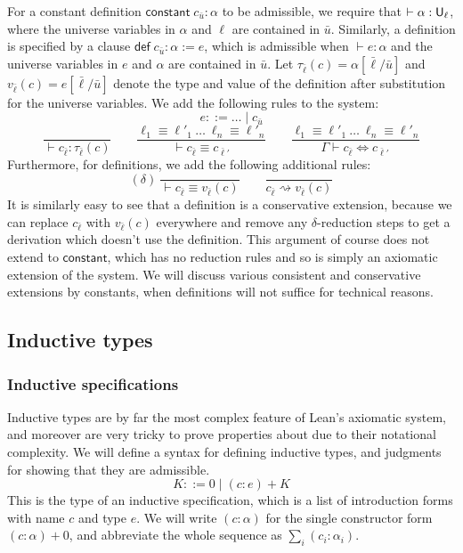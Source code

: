 For a constant definition $\mathsf{constant}\;c_{\bar u}:\alpha$ to be admissible, we require that $\vdash\alpha:\mathsf{U}_\ell$, where the universe variables in $\alpha$ and $\ell$ are contained in $\bar u$. Similarly, a definition is specified by a clause $\mathsf{def}\;c_{\bar u}:\alpha:=e$, which is admissible when $\vdash e:\alpha$ and the universe variables in $e$ and $\alpha$ are contained in $\bar u$. Let $\tau_{\bar\ell}(c)=\alpha[\bar\ell/\bar u]$ and $v_{\bar\ell}(c)=e[\bar\ell/\bar u]$ denote the type and value of the definition after substitution for the universe variables. We add the following rules to the system:
$$e::=\dots\mid c_{\bar u}$$
$$\frac{}{\vdash c_{\bar\ell}:\tau_{\bar\ell}(c)}\qquad
\frac{\ell_1\equiv\ell'_1\ \dots\ \ell_n\equiv\ell'_n}{\vdash c_{\bar\ell}\equiv c_{\bar\ell'}}\qquad\frac{\ell_1\equiv\ell'_1\ \dots\ \ell_n\equiv\ell'_n}{\Gamma\vdash c_{\bar\ell}\Leftrightarrow c_{\bar\ell'}}$$
Furthermore, for definitions, we add the following additional rules:
$$(\delta)\ \frac{}{\vdash c_{\bar\ell}\equiv v_{\bar\ell}(c)}\qquad
\frac{}{c_{\bar\ell}\rightsquigarrow v_{\bar\ell}(c)}$$
It is similarly easy to see that a definition is a conservative extension, because we can replace $c_{\bar\ell}$ with $v_{\bar\ell}(c)$ everywhere and remove any $\delta$-reduction steps to get a derivation which doesn't use the definition. This argument of course does not extend to $\mathsf{constant}$, which has no reduction rules and so is simply an axiomatic extension of the system. We will discuss various consistent and conservative extensions by constants, when definitions will not suffice for technical reasons.

\subsection{Inductive types}\label{sec:inductive}

\subsubsection{Inductive specifications}
Inductive types are by far the most complex feature of Lean's axiomatic system, and moreover are very tricky to prove properties about due to their notational complexity. We will define a syntax for defining inductive types, and judgments for showing that they are admissible.
$$K::=0\mid (c:e)+K$$
This is the type of an inductive specification, which is a list of introduction forms with name $c$ and type $e$. We will write $(c:\alpha)$ for the single constructor form $(c:\alpha)+0$, and abbreviate the whole sequence as $\sum_i(c_i:\alpha_i)$.

